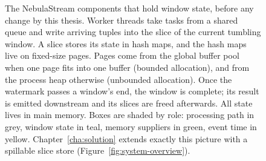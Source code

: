 \begin{figure}[H]
{\begin{tikzpicture}
\end{tikzpicture}%
}
\caption[NebulaStream components that hold window state]{%
The NebulaStream components that hold window state, before any change by this
thesis. Worker threads take tasks from a shared queue and write arriving tuples
into the slice of the current tumbling window. A slice stores its state in hash
maps, and the hash maps live on fixed-size pages. Pages come from the global
buffer pool when one page fits into one buffer (bounded allocation), and from
the process heap otherwise (unbounded allocation). Once the watermark passes a
window's end, the window is complete; its result is emitted downstream and its
slices are freed afterwards. All state lives in main memory. Boxes are shaded
by role: processing path in grey, window state in teal, memory suppliers in
green, event time in yellow. Chapter~\ref{cha:solution}
extends exactly this picture with a spillable slice store
(Figure~\ref{fig:system-overview}).}
\label{fig:nes-components}
\end{figure}
